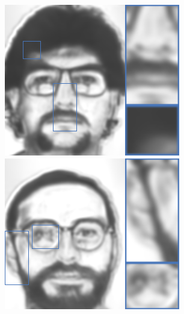 \documentclass[10pt,twocolumn,letterpaper]{article}
\begin{document}
\begin{figure}[htbp]
{\begin{minipage}[b]{0.13\linewidth}
\includegraphics[width=0.99\linewidth]{img/sketch_result/fcnn_s3.png}
\includegraphics[width=0.99\linewidth]{img/sketch_result/fcnn_s4.png}
\end{minipage}
}
\end{figure}
\end{document}
